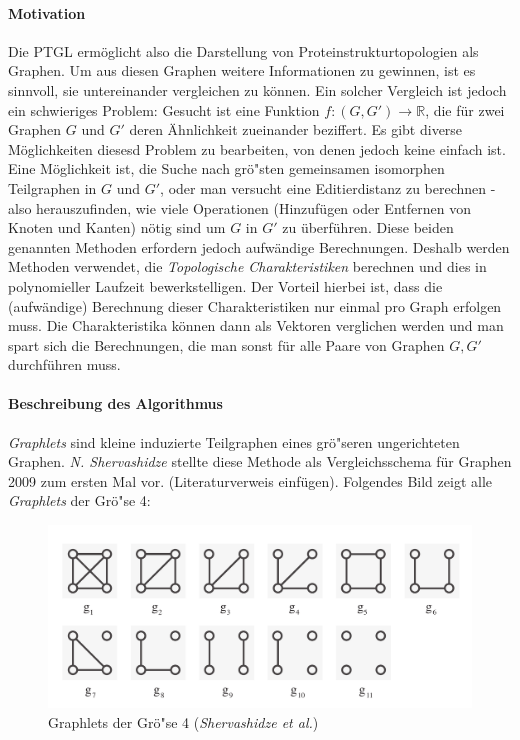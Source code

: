 \documentclass{report}
\begin{document}
\paragraph{Motivation}
Die PTGL \cite{vplg} erm\"oglicht also die Darstellung von Proteinstrukturtopologien als Graphen. Um aus diesen Graphen weitere Informationen zu gewinnen, ist es sinnvoll, sie untereinander vergleichen zu k\"onnen. Ein solcher Vergleich ist jedoch ein schwieriges Problem: Gesucht ist eine Funktion $f: (G,G') \rightarrow \mathbb{R} $, die f\"ur zwei Graphen $G$ und $G'$ deren \"Ahnlichkeit zueinander beziffert.
Es gibt diverse M\"oglichkeiten diesesd Problem zu bearbeiten, von denen jedoch keine einfach ist.
Eine M\"oglichkeit ist, die Suche nach gr\"o"sten gemeinsamen isomorphen Teilgraphen in $G$ und $G'$, oder man versucht eine Editierdistanz zu berechnen - also herauszufinden, wie viele Operationen (Hinzuf\"ugen oder Entfernen von Knoten und Kanten) n\"otig sind um $G$ in $G'$ zu \"uberf\"uhren. Diese beiden genannten Methoden erfordern jedoch aufw\"andige Berechnungen.
Deshalb werden Methoden verwendet, die \emph{Topologische Charakteristiken} berechnen und dies in polynomieller Laufzeit bewerkstelligen. Der Vorteil hierbei ist, dass die (aufw\"andige) Berechnung dieser Charakteristiken nur einmal pro Graph erfolgen muss. Die Charakteristika k\"onnen dann als Vektoren verglichen werden und man spart sich die Berechnungen, die man sonst f\"ur alle Paare von Graphen $G,G'$ durchf\"uhren muss.



\paragraph{Beschreibung des Algorithmus}
\textit{Graphlets} sind kleine induzierte Teilgraphen eines gr\"o"seren ungerichteten Graphen. \textit{N. Shervashidze} stellte diese Methode als Vergleichsschema f\"ur Graphen 2009 zum ersten Mal vor.  (Literaturverweis einf\"ugen). Folgendes Bild zeigt alle \textit{Graphlets} der Gr\"o"se 4:

\begin{figure}[h]
\includegraphics[width =\linewidth]{4graphlets.pdf}
\caption{Graphlets der Gr\"o"se 4 (\textit{Shervashidze et al.})}
\label{fig:4graphlets}
\end{figure}
\end{document}
